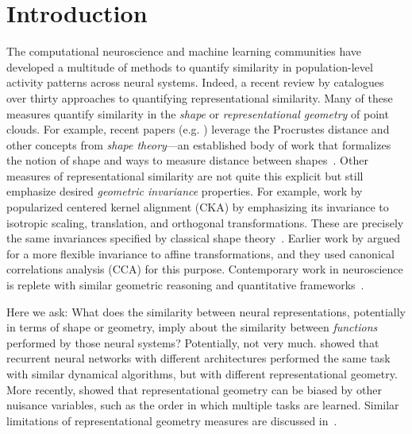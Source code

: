 \section{Introduction}
\label{sec:intro}

The computational neuroscience and machine learning communities have developed a multitude of methods to quantify similarity in population-level activity patterns across neural systems.
Indeed, a recent review by \textcite{klabunde2023similarity} catalogues over thirty approaches to quantifying representational similarity.
Many of these measures quantify similarity in the \textit{shape} or \textit{representational geometry} of point clouds.
For example, recent papers (e.g. \cite{williams2021generalized,Ding2021}) leverage the Procrustes distance and other concepts from \textit{shape theory}---an established body of work that formalizes the notion of shape and ways to measure distance between shapes~\cite{kendall2009shape,dryden2016statistical}.
Other measures of representational similarity are not quite this explicit but still emphasize desired \textit{geometric invariance} properties.
For example, work by \textcite{kornblith2019} popularized centered kernel alignment (CKA) by emphasizing its invariance to isotropic scaling, translation, and orthogonal transformations.
These are precisely the same invariances specified by classical shape theory~\cite{kendall2009shape,dryden2016statistical}.
Earlier work by \textcite{raghu2017svcca} argued for a more flexible invariance to affine transformations, and they used canonical correlations analysis (CCA) for this purpose.
Contemporary work in neuroscience is replete with similar geometric reasoning and quantitative frameworks~\cite{Kriegeskorte2021}.

Here we ask: What does the similarity between neural representations, potentially in terms of shape or geometry, imply about the similarity between \emph{functions} performed by those neural systems?
Potentially, not very much.
\textcite{Maheswaranathan2019} showed that recurrent neural networks with different architectures performed the same task with similar dynamical algorithms, but with different representational geometry.
More recently, \textcite{lampinen2024learned} showed that representational geometry can be biased by other nuisance variables, such as the order in which multiple tasks are learned.
Similar limitations of representational geometry measures are discussed in~\cite{dujmovic2022some,davari2023reliability}.

